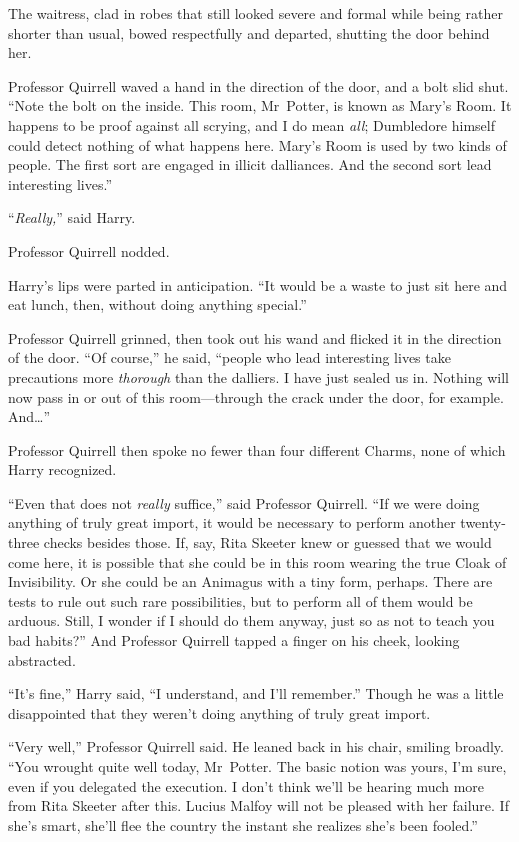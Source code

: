 The waitress, clad in robes that still looked severe and formal while being rather shorter than usual, bowed respectfully and departed, shutting the door behind her.

Professor Quirrell waved a hand in the direction of the door, and a bolt slid shut.
“Note the bolt on the inside. This room, Mr~Potter, is known as Mary’s Room. It happens to be proof against all scrying, and I do mean \emph{all}; Dumbledore himself could detect nothing of what happens here. Mary’s Room is used by two kinds of people. The first sort are engaged in illicit dalliances. And the second sort lead interesting lives.”

“\emph{Really,}” said Harry.

Professor Quirrell nodded.

Harry’s lips were parted in anticipation.
“It would be a waste to just sit here and eat lunch, then, without doing anything special.”

Professor Quirrell grinned, then took out his wand and flicked it in the direction of the door.
“Of course,” he said, “people who lead interesting lives take precautions more \emph{thorough} than the dalliers. I have just sealed us in. Nothing will now pass in or out of this room—through the crack under the door, for example. And…”

Professor Quirrell then spoke no fewer than four different Charms, none of which Harry recognized.

“Even that does not \emph{really} suffice,” said Professor Quirrell.
“If we were doing anything of truly great import, it would be necessary to perform another twenty-three checks besides those. If, say, Rita Skeeter knew or guessed that we would come here, it is possible that she could be in this room wearing the true Cloak of Invisibility. Or she could be an Animagus with a tiny form, perhaps. There are tests to rule out such rare possibilities, but to perform all of them would be arduous. Still, I wonder if I should do them anyway, just so as not to teach you bad habits?” And Professor Quirrell tapped a finger on his cheek, looking abstracted.

“It’s fine,” Harry said,
“I understand, and I’ll remember.” Though he was a little disappointed that they weren’t doing anything of truly great import.

“Very well,” Professor Quirrell said. He leaned back in his chair, smiling broadly.
“You wrought quite well today, Mr~Potter. The basic notion was yours, I’m sure, even if you delegated the execution. I don’t think we’ll be hearing much more from Rita Skeeter after this. Lucius Malfoy will not be pleased with her failure. If she’s smart, she’ll flee the country the instant she realizes she’s been fooled.”

